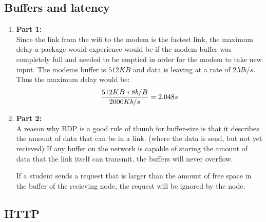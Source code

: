 \documentclass[10pt]{article}
\begin{document}
\subsection{Buffers and latency}
\begin{enumerate}
    \item \textbf{Part 1:}\\
    Since the link from the wifi to the modem is the fastest link, the maximum
    delay a package would experience would be if the modem-buffer was completely
    full and needed to be emptied in order for the modem to take new input. The
    modems buffer is $512KB$ and data is leaving at a rate of $2Mb/s$.
    Thus the maximum delay would be:
    \[
        \frac{512KB*8b/B}{2000Kb/s} = 2.048s\\
    \]

    \item \textbf{Part 2:}\\
    A reason why BDP is a good rule of thumb for buffer-size is that it
    describes the amount of data that can be in a link. (where the data is send,
    but not yet recieved) If any buffer on the network is capable of storing the
    amount of data that the link itself can transmit, the buffers will never
    overflow.

    If a student sends a request that is larger than the amount of free space in
    the buffer of the recieving node, the request will be ignored by the node.
\end{enumerate}

\subsection{HTTP}
\end{document}
